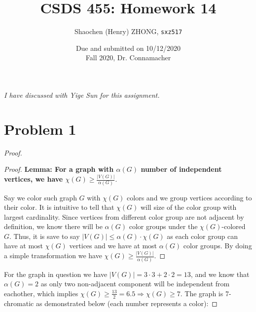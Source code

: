 \documentclass[11pt]{article}
\newcommand{\ilc}{\texttt}
\begin{document}
\title{\textbf{CSDS 455: Homework 14}}

\author{Shaochen (Henry) ZHONG, \ilc{sxz517}}
\date{Due and submitted on 10/12/2020 \\ Fall 2020, Dr. Connamacher}
\maketitle

\textit{I have discussed with Yige Sun for this assignment.}

\section*{Problem 1}

\begin{proof}

\leavevmode\newline


    \begin{adjustwidth}{1cm}{}

    \begin{proof}
    \textbf{Lemma: For a graph with $\alpha(G)$ number of independent vertices, we have $\chi(G) \geq \frac{|V(G)|}{\alpha(G)}$}.\newline

    Say we color such graph $G$ with $\chi(G)$ colors and we group vertices according to their color. It is intuitive to tell that $\chi(G)$ will size of the color group with largest cardinality. Since vertices from different color group are not adjacent by definition, we know there will be $\alpha(G)$ color groups under the $\chi(G)$-colored $G$. Thus, it is save to say $|V(G)| \leq \alpha(G) \cdot \chi(G)$ as each color group can have at most $\chi(G)$ vertices and we have at most $\alpha(G)$ color groups. By doing a simple transformation we have $\chi(G) \geq \frac{|V(G)|}{\alpha(G)}$.




    \end{proof}

    \end{adjustwidth}

For the graph in question we have $|V(G)| = 3 \cdot 3 + 2 \cdot 2 = 13$, and we know that $\alpha(G) = 2$ as only two non-adjacent component will be independent from eachother, which implies $\chi(G) \geq \frac{13}{2} = 6.5 \Longrightarrow \chi(G) \geq 7$. The graph is 7-chromatic as demonstrated below (each number represents a color):




\end{proof}
\end{document}
